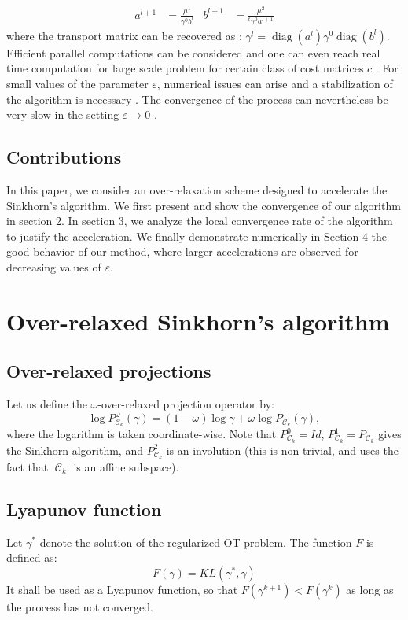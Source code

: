 \documentclass{article} %
\DeclareMathOperator{\Ccal}{\mathcal{C}}
\DeclareMathOperator{\diag}{diag}
\renewcommand{\epsilon}{\varepsilon}
\theoremstyle{plain}
\theoremstyle{definition}
\theoremstyle{remark}
\begin{document}
\begin{align*}
a^{l+1} &= \frac{\mu^1}{\gamma^0 b^l} &
b^{l+1} &= \frac{\mu^2}{^t \gamma^0 a^{l+1}} 
\end{align*}
where the transport matrix can be recovered as :
$\gamma^l = \diag(a^l) \gamma^0 \diag(b^l).$ 
Efficient parallel computations can be considered \cite{cuturi13} and one can even reach real time computation for large scale problem for certain class of cost matrices $c$ \cite{Solomon2015}. 
For small values of the parameter $\epsilon$, numerical issues can arise and a stabilization of the algorithm is necessary \cite{2016arXiv160705816C}.
The convergence of the process can nevertheless be very slow  in the setting $\epsilon\to 0$ .
\subsection{Contributions}
In this paper, we consider an over-relaxation scheme  designed to accelerate  the Sinkhorn's algorithm. We first present and show the convergence of our algorithm in section 2. In section 3, we analyze the local convergence rate of the algorithm to justify the acceleration.
We finally demonstrate numerically  in Section 4 the good behavior of our method, where larger accelerations are observed for decreasing values of $\epsilon$.



\section{Over-relaxed Sinkhorn's algorithm}

\subsection{Over-relaxed projections}

Let us define the $\omega$-over-relaxed projection operator by:
\begin{equation}\label{eq:def_or_proj}
\log P^\omega_{\Ccal_k}(\gamma) = (1-\omega) \log \gamma + \omega \log P_{\Ccal_k}(\gamma),
\end{equation}
where the logarithm is taken coordinate-wise.
Note that $P_{\Ccal_k}^0 = Id$, $P_{\Ccal_k}^1 = P_{\Ccal_k}$ gives the Sinkhorn algorithm, and $P_{\Ccal_k}^2$ is an involution (this is non-trivial, and uses the fact that $\Ccal_k$ is an affine subspace).

\subsection{Lyapunov function}
Let $\gamma^*$ denote the solution of the regularized OT problem.
The function $F$ is defined as:
\begin{equation}\label{eq:lyapunov_function}
F(\gamma) = KL(\gamma^*, \gamma)
\end{equation}
It shall be used as a Lyapunov function, so that $F(\gamma^{k+1}) < F(\gamma^k)$ as long as the process has not converged.
\end{document}
